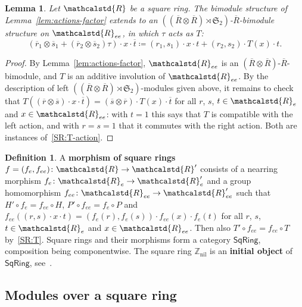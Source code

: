 \documentclass[reqno,a4paper]{amsart}
\theoremstyle{plain}
\newtheorem{lemma}[subsection]{Lemma}
\theoremstyle{definition}
\newtheorem{definition}[subsection]{Definition}
\newcommand{\defn}{\textbf}
\newcommand{\DefEq}{\coloneq}
\newcommand{\R}{\ensuremath{\mathcalstd{R}}}
\newcommand{\Z}{\ensuremath{\mathbb{Z}}}
\newcommand{\SqRing}{\ensuremath{\mathsf{SqRing}}}
\DeclareMathOperator{\nil}{nil}
\renewcommand{\Re}{\ensuremath{\R_{e}}}
\newcommand{\Ree}{\ensuremath{\R_{ee}}}
\newcommand{\Rbar}{\ensuremath{\overline{R}}}
\begin{document}
\begin{lemma}\label{lem:wreath}
  Let \(\R\) be a square ring. The bimodule structure of Lemma~\ref{lem:actions-factor} extends to an \(((\Rbar\otimes\Rbar)\rtimes\mathfrak{S}_2)\)-\(\Rbar\)-bimodule structure on \(\Ree\), in which \(\tau\) acts as \(T\):
  \[
    (\overline{r}_1\otimes\overline{s}_1+(\overline{r}_2\otimes\overline{s}_2)\tau)\cdot x\cdot\overline{t}\DefEq(r_1,s_1)\cdot x\cdot t+(r_2,s_2)\cdot T(x)\cdot t\text{.}
  \]
\end{lemma}

\begin{proof}
  By Lemma~\ref{lem:actions-factor}, \(\Ree\) is an \((\Rbar\otimes\Rbar)\)-\(\Rbar\)-bimodule, and \(T\) is an additive involution of \(\Ree\). By the description of left \(((\Rbar\otimes\Rbar)\rtimes\mathfrak{S}_2)\)-modules given above, it remains to check that \(T((\overline{r}\otimes\overline{s})\cdot x\cdot\overline{t})=(\overline{s}\otimes\overline{r})\cdot T(x)\cdot\overline{t}\) for all \(r\), \(s\), \(t\in\Re\) and \(x\in\Ree\): with \(t=1\) this says that \(T\) is compatible with the left action, and with \(r=s=1\) that it commutes with the right action. Both are instances of~\ref{SR:T-action}.
\end{proof}

\begin{definition}\label{def:square-ring-morphism}
  A \defn{morphism of square rings} \(f=(f_{e},f_{ee})\colon \R\to\R'\) consists of a nearring morphism \(f_{e}\colon \Re\to\R'_{e}\) and a group homomorphism \(f_{ee}\colon \Ree\to\R'_{ee}\) such that \(H'\circ f_{e}=f_{ee}\circ H\), \(P'\circ f_{ee}=f_{e}\circ P\) and \(f_{ee}((r,s)\cdot x\cdot t)=(f_{e}(r),f_{e}(s))\cdot f_{ee}(x)\cdot f_{e}(t)\) for all \(r\), \(s\), \(t\in\Re\) and \(x\in\Ree\). Then also \(T'\circ f_{ee}=f_{ee}\circ T\) by~\ref{SR:T}. Square rings and their morphisms form a category \(\SqRing\), composition being componentwise. The square ring \(\Z_{\nil}\) is an \defn{initial object} of \(\SqRing\), see~\cite{BHP}.
\end{definition}


\subsection{Modules over a square ring}\label{sec:modules}
\end{document}
